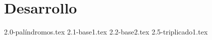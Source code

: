 \part{Desarrollo}

\setcounter{section}{-1}

{2.0-palíndromos.tex}
\newpage
{2.1-base1.tex}
\newpage
{2.2-base2.tex}
\newpage
{2.5-triplicado1.tex}


\newpage